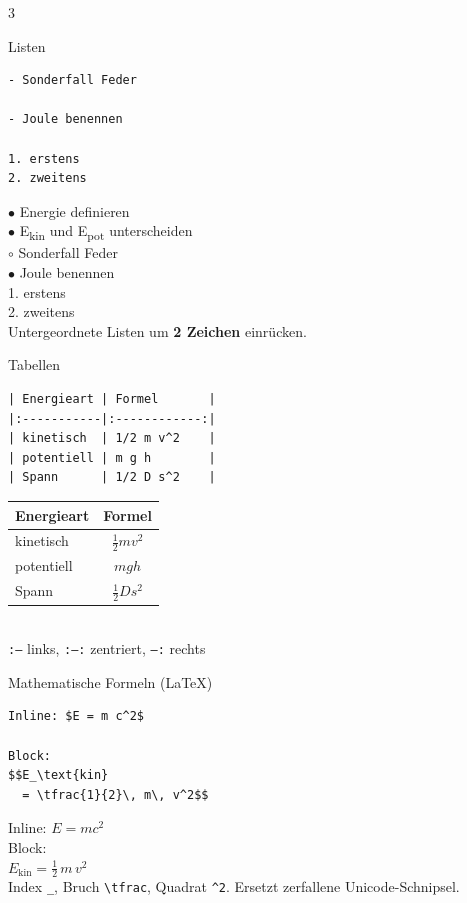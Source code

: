\documentclass[a4paper,landscape,9pt]{extarticle}
\newcommand{\prevtxt}[1]{{\small #1}}
\begin{document}
\begin{multicols}{3}
\begin{mdcard}{Listen}
\begin{lstlisting}[language=lia]
  - Sonderfall Feder

- Joule benennen

1. erstens
2. zweitens
\end{lstlisting}
\tcblower
\prevtxt{%
$\bullet$ Energie definieren\\
$\bullet$ E\textsubscript{kin} und E\textsubscript{pot} unterscheiden\\[2pt]
\hspace*{1em}$\circ$ Sonderfall Feder\\[2pt]
$\bullet$ Joule benennen\\[3pt]
1. erstens\\
2. zweitens\\[2pt]
{\scriptsize\color{muted}Untergeordnete Listen um \textbf{2 Zeichen} einrücken.}}
\end{mdcard}


\begin{mdcard}{Tabellen}
\begin{lstlisting}[language=lia]
| Energieart | Formel       |
|:-----------|:------------:|
| kinetisch  | 1/2 m v^2    |
| potentiell | m g h        |
| Spann      | 1/2 D s^2    |
\end{lstlisting}
\tcblower
\prevtxt{%
\renewcommand{\arraystretch}{1.05}%
\begin{tabular}{|l|c|}\hline
\textbf{Energieart} & \textbf{Formel}\\\hline
kinetisch  & $\tfrac{1}{2}mv^2$\\
potentiell & $mgh$\\
Spann      & $\tfrac{1}{2}Ds^2$\\\hline
\end{tabular}\\[2pt]
{\scriptsize\color{muted}\texttt{:--} links, \texttt{:--:} zentriert, \texttt{--:} rechts}}
\end{mdcard}

\begin{mdcard}{Mathematische Formeln (LaTeX)}
\begin{lstlisting}[language=lia]
Inline: $E = m c^2$

Block:
$$E_\text{kin}
  = \tfrac{1}{2}\, m\, v^2$$
\end{lstlisting}
\tcblower
\prevtxt{Inline: $E = m c^2$\\[3pt]
Block:\\
$\displaystyle E_\text{kin} = \tfrac{1}{2}\, m\, v^2$\\[3pt]
{\scriptsize\color{muted}Index \texttt{\_}, Bruch \texttt{\textbackslash tfrac}, Quadrat \texttt{\^{}2}.
Ersetzt zerfallene Unicode-Schnipsel.}}
\end{mdcard}


\end{multicols}
\end{document}

